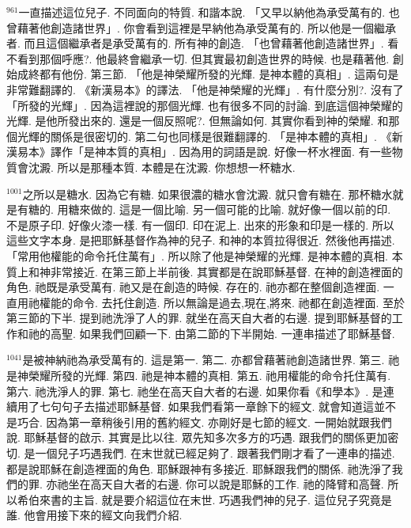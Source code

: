 \documentclass{book}
\begin{document}
$^{961}$一直描述這位兒子.
不同面向的特質.
和諧本說.
「又早以納他為承受萬有的.
也曾藉著他創造諸世界」.
你會看到這裡是早納他為承受萬有的.
所以他是一個繼承者.
而且這個繼承者是承受萬有的.
所有神的創造.
「也曾藉著他創造諸世界」.
看不看到那個呼應?.
他最終會繼承一切.
但其實最初創造世界的時候.
也是藉著他.
創始成終都有他份.
第三節.
「他是神榮耀所發的光輝.
是神本體的真相」.
這兩句是非常難翻譯的.
《新漢易本》的譯法.
「他是神榮耀的光輝」.
有什麼分別?.
沒有了「所發的光輝」.
因為這裡說的那個光輝.
也有很多不同的討論.
到底這個神榮耀的光輝.
是他所發出來的.
還是一個反照呢?.
但無論如何.
其實你看到神的榮耀.
和那個光輝的關係是很密切的.
第二句也同樣是很難翻譯的.
「是神本體的真相」.
《新漢易本》譯作「是神本質的真相」.
因為用的詞語是說.
好像一杯水裡面.
有一些物質會沈澱.
所以是那種本質.
本體是在沈澱.
你想想一杯糖水.

$^{1001}$之所以是糖水.
因為它有糖.
如果很濃的糖水會沈澱.
就只會有糖在.
那杯糖水就是有糖的.
用糖來做的.
這是一個比喻.
另一個可能的比喻.
就好像一個以前的印.
不是原子印.
好像火漆一樣.
有一個印.
印在泥上.
出來的形象和印是一樣的.
所以這些文字本身.
是把耶穌基督作為神的兒子.
和神的本質拉得很近.
然後他再描述.
「常用他權能的命令托住萬有」.
所以除了他是神榮耀的光輝.
是神本體的真相.
本質上和神非常接近.
在第三節上半前後.
其實都是在說耶穌基督.
在神的創造裡面的角色.
祂既是承受萬有.
祂又是在創造的時候.
存在的.
祂亦都在整個創造裡面.
一直用祂權能的命令.
去托住創造.
所以無論是過去,現在,將來.
祂都在創造裡面.
至於第三節的下半.
提到祂洗淨了人的罪.
就坐在高天自大者的右邊.
提到耶穌基督的工作和祂的高聖.
如果我們回顧一下.
由第二節的下半開始.
一連串描述了耶穌基督.

$^{1041}$是被神納祂為承受萬有的.
這是第一.
第二.
亦都曾藉著祂創造諸世界.
第三.
祂是神榮耀所發的光輝.
第四.
祂是神本體的真相.
第五.
祂用權能的命令托住萬有.
第六.
祂洗淨人的罪.
第七.
祂坐在高天自大者的右邊.
如果你看《和學本》.
是連續用了七句句子去描述耶穌基督.
如果我們看第一章餘下的經文.
就會知道這並不是巧合.
因為第一章稍後引用的舊約經文.
亦剛好是七節的經文.
一開始就跟我們說.
耶穌基督的啟示.
其實是比以往.
眾先知多次多方的巧遇.
跟我們的關係更加密切.
是一個兒子巧遇我們.
在末世就已經足夠了.
跟著我們剛才看了一連串的描述.
都是說耶穌在創造裡面的角色.
耶穌跟神有多接近.
耶穌跟我們的關係.
祂洗淨了我們的罪.
亦祂坐在高天自大者的右邊.
你可以說是耶穌的工作.
祂的降臂和高聲.
所以希伯來書的主旨.
就是要介紹這位在末世.
巧遇我們神的兒子.
這位兒子究竟是誰.
他會用接下來的經文向我們介紹.
\end{document}

